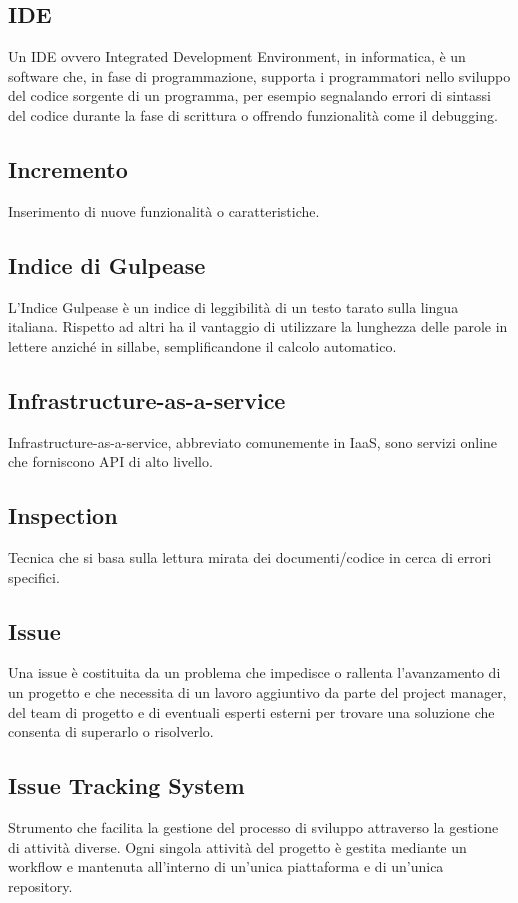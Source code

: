 

\subsection*{IDE}
Un IDE ovvero Integrated Development Environment, in informatica, è un software che, in fase di programmazione, supporta i programmatori nello sviluppo del codice sorgente di un programma, per esempio segnalando errori di sintassi del codice durante la fase di scrittura o offrendo funzionalità come il debugging.

\subsection*{Incremento}
Inserimento di nuove funzionalità o caratteristiche.

\subsection*{Indice di Gulpease}
L'Indice Gulpease è un indice di leggibilità di un testo tarato sulla lingua italiana. Rispetto ad altri ha il vantaggio di utilizzare la lunghezza delle parole in lettere anziché in sillabe, semplificandone il calcolo automatico.

\subsection*{Infrastructure-as-a-service}
Infrastructure-as-a-service, abbreviato comunemente in IaaS, sono servizi online che forniscono API di alto livello.

\subsection*{Inspection}
Tecnica che si basa sulla lettura mirata dei documenti/codice in cerca di errori specifici.

\subsection*{Issue}
Una issue è costituita da un problema che impedisce o rallenta l’avanzamento di un progetto e che necessita di un lavoro aggiuntivo da parte del project manager, del team di progetto e di eventuali esperti esterni per trovare una soluzione che consenta di superarlo o risolverlo.

\subsection*{Issue Tracking System}
Strumento che facilita la gestione del processo di sviluppo attraverso la gestione di attività diverse.
Ogni singola attività del progetto è gestita mediante un workflow e mantenuta all’interno di un’unica piattaforma e di un’unica repository.

